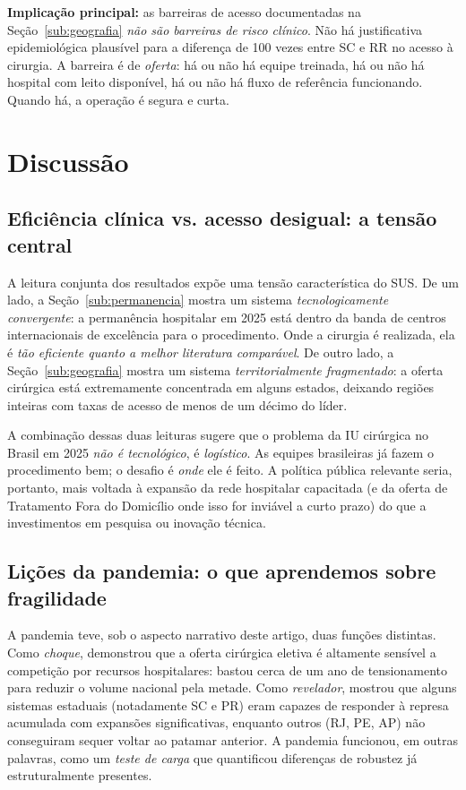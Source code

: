 \documentclass[12pt,a4paper,oneside]{article}
\begin{document}
\textbf{Implicação principal:} as barreiras de acesso documentadas
na Seção~\ref{sub:geografia} \textit{não são barreiras de risco
clínico}. Não há justificativa epidemiológica plausível para a
diferença de 100 vezes entre SC e RR no acesso à cirurgia. A
barreira é de \textit{oferta}: há ou não há equipe treinada, há
ou não há hospital com leito disponível, há ou não há fluxo de
referência funcionando. Quando há, a operação é segura e curta.

\section{Discussão}\label{sec:discussao}

\subsection{Eficiência clínica vs. acesso desigual: a tensão central}

A leitura conjunta dos resultados expõe uma tensão característica
do SUS. De um lado, a Seção~\ref{sub:permanencia} mostra um sistema
\textit{tecnologicamente convergente}: a permanência hospitalar
em 2025 está dentro da banda de centros internacionais de excelência
para o procedimento. Onde a cirurgia é realizada, ela é
\textit{tão eficiente quanto a melhor literatura comparável}. De
outro lado, a Seção~\ref{sub:geografia} mostra um sistema
\textit{territorialmente fragmentado}: a oferta cirúrgica está
extremamente concentrada em alguns estados, deixando regiões
inteiras com taxas de acesso de menos de um décimo do líder.

A combinação dessas duas leituras sugere que o problema da IU
cirúrgica no Brasil em 2025 \textit{não é tecnológico}, é
\textit{logístico}. As equipes brasileiras já fazem o procedimento
bem; o desafio é \textit{onde} ele é feito. A política pública
relevante seria, portanto, mais voltada à expansão da rede
hospitalar capacitada (e da oferta de Tratamento Fora do
Domicílio onde isso for inviável a curto prazo) do que a
investimentos em pesquisa ou inovação técnica.

\subsection{Lições da pandemia: o que aprendemos sobre fragilidade}

A pandemia teve, sob o aspecto narrativo deste artigo, duas
funções distintas. Como \textit{choque}, demonstrou que a
oferta cirúrgica eletiva é altamente sensível a competição por
recursos hospitalares: bastou cerca de um ano de tensionamento
para reduzir o volume nacional pela metade. Como
\textit{revelador}, mostrou que alguns sistemas estaduais
(notadamente SC e PR) eram capazes de responder à represa
acumulada com expansões significativas, enquanto outros (RJ,
PE, AP) não conseguiram sequer voltar ao patamar anterior. A
pandemia funcionou, em outras palavras, como um \textit{teste
de carga} que quantificou diferenças de robustez já
estruturalmente presentes.
\end{document}
